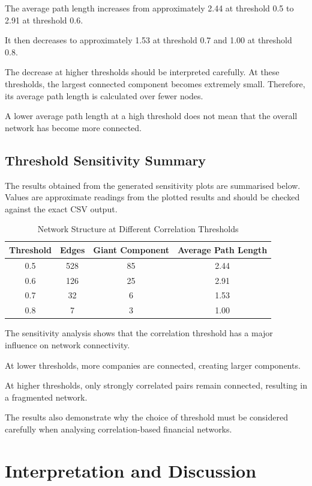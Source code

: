 \documentclass[11pt,a4paper]{article}
\begin{document}
The average path length increases from approximately
2.44 at threshold 0.5 to 2.91 at threshold 0.6.

It then decreases to approximately 1.53 at threshold
0.7 and 1.00 at threshold 0.8.

The decrease at higher thresholds should be interpreted
carefully. At these thresholds, the largest connected
component becomes extremely small. Therefore, its
average path length is calculated over fewer nodes.

A lower average path length at a high threshold does
not mean that the overall network has become more
connected.

\subsection{Threshold Sensitivity Summary}

The results obtained from the generated sensitivity
plots are summarised below. Values are approximate
readings from the plotted results and should be
checked against the exact CSV output.

\begin{table}[H]
\centering
\caption{Network Structure at Different Correlation Thresholds}
\label{tab:threshold_summary}
\begin{tabular}{cccc}
\toprule
\textbf{Threshold} &
\textbf{Edges} &
\textbf{Giant Component} &
\textbf{Average Path Length}\\
\midrule
0.5 & 528 & 85 & 2.44\\
0.6 & 126 & 25 & 2.91\\
0.7 & 32 & 6 & 1.53\\
0.8 & 7 & 3 & 1.00\\
\bottomrule
\end{tabular}
\end{table}

The sensitivity analysis shows that the correlation
threshold has a major influence on network connectivity.

At lower thresholds, more companies are connected,
creating larger components.

At higher thresholds, only strongly correlated pairs
remain connected, resulting in a fragmented network.

The results also demonstrate why the choice of
threshold must be considered carefully when analysing
correlation-based financial networks.

\section{Interpretation and Discussion}
\end{document}
